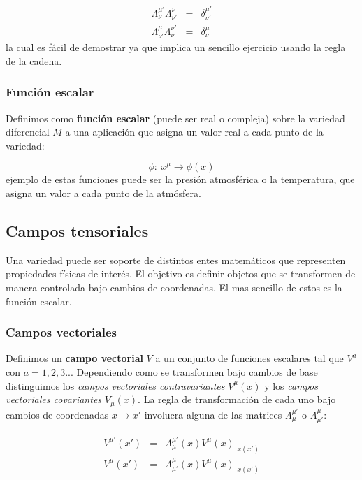 \documentclass[12pt,a4paper]{book}
\numberwithin{equation}{section}
\numberwithin{figure}{section}
\begin{document}
\begin{eqnarray}
\Lambda^{\mu'}_{\nu} \Lambda^{\nu}_{\nu'} & = & \delta^{\mu'}_{\nu'}  \\
\Lambda^{\mu}_{\nu'} \Lambda^{\nu'}_{\nu} & = & \delta^{\mu}_{\nu}  
\end{eqnarray}
la cual es fácil de demostrar ya que implica un sencillo ejercicio usando la regla de la cadena. 

\subsubsection{Función escalar}

Definimos como \textbf{función escalar} (puede ser real o compleja) sobre la variedad diferencial $M$ a una aplicación que asigna un valor real a cada punto de la variedad:

\begin{equation}
\phi : \ x^{\mu} \rightarrow \phi(x)
\end{equation} 
ejemplo de estas funciones puede ser la presión atmosférica o la temperatura, que asigna un valor a cada punto de la atmósfera.  \\


\subsection{Campos tensoriales}

Una variedad puede ser soporte de distintos entes matemáticos que representen propiedades físicas de interés. El objetivo es definir objetos que se transformen de manera controlada bajo cambios de coordenadas. El mas sencillo de estos es la función escalar. 

\subsubsection{Campos vectoriales}

Definimos un \textbf{campo vectorial} $V$ a un conjunto de funciones escalares tal que $V^a$ con $a=1,2,3...$ Dependiendo como se transformen bajo cambios de base distinguimos los \textit{campos vectoriales contravariantes} $V^{\mu}(x)$ y los \textit{campos vectoriales covariantes} $V_{\mu}(x)$. La regla de transformación de cada uno bajo cambios de coordenadas $x\rightarrow x'$ involucra alguna de las matrices $\Lambda^{\mu'}_{\mu}$ o $\Lambda^{\mu}_{\mu'}$:

\begin{eqnarray}
V^{\mu'}(x') & = & \Lambda^{\mu'}_{\mu} (x) V^{\mu}(x) \big\vert_{x(x')} \\
V^{\mu}(x') & = & \Lambda^{\mu}_{\mu'} (x) V^{\mu}(x) \big\vert_{x(x')} \\
\end{eqnarray}
\end{document}
